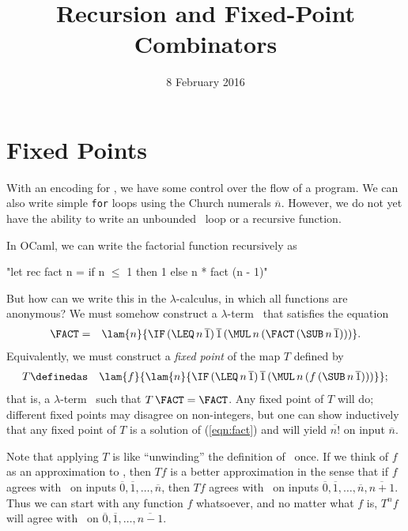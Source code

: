 \title{Recursion and Fixed-Point Combinators}
\date{8 February 2016}
\maketitle

\section{Fixed Points}

With an encoding for \IF, we have some control over the flow of a program. We can also write simple \texttt{for} loops using the Church numerals $\overline n$. However, we do not yet have the ability to write an unbounded \WHILE\ loop or a recursive function.

In OCaml, we can write the factorial function recursively as
\begin{center}
"let rec fact n = if n $\le$ 1 then 1 else n * fact (n - 1)"
\end{center}
But how can we write this in the $\lambda$-calculus, in which all functions are anonymous? We must somehow construct a $\lambda$-term \FACT\ that satisfies the equation
\begin{eqnarray}
\FACT &=& \lam{n}{\IF\,(\LEQ\,n\,\overline 1)\,\overline 1\,(\MUL\,n\,(\FACT\,(\SUB\,n\,\overline 1)))}.\label{eqn:fact}
\end{eqnarray}
Equivalently, we must construct a \emph{fixed point} of the map $T$ defined by
\begin{eqnarray*}
T &\definedas& \lam{f}{\lam{n}{\IF\,(\LEQ\,n\,\overline 1)\,\overline 1\,(\MUL\,n\,(f\,(\SUB\,n\,\overline 1)))}};
\end{eqnarray*}
that is, a $\lambda$-term \FACT\ such that $T\,\FACT=\FACT$.
Any fixed point of $T$ will do; different fixed points may disagree on non-integers, but one can show inductively that any
fixed point of $T$ is a solution of (\ref{eqn:fact}) and will yield $\overline{n!}$ on input $\overline n$.

Note that applying $T$ is like ``unwinding'' the definition of \FACT\ once.
If we think of $f$ as an approximation to \FACT, then $Tf$ is a better approximation in the
sense that if $f$ agrees with \FACT\ on inputs $\overline 0,\overline 1,\ldots,\overline n$, then
$Tf$ agrees with \FACT\ on inputs $\overline 0,\overline 1,\ldots,\overline n,\overline{n+1}$. Thus
we can start with any function $f$ whatsoever, and no matter what $f$ is,
$T^nf$ will agree with \FACT\ on $\overline 0,\overline 1,\ldots,\overline{n-1}$.

